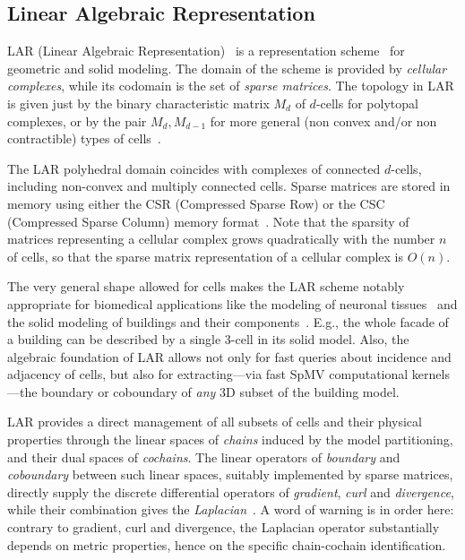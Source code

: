           


\subsection{Linear Algebraic Representation}

LAR (Linear Algebraic Representation)~\cite{Dicarlo:2014:TNL:2543138.2543294} is a 
representation scheme~\cite{Requicha:1980:RRS:356827.356833} for
geometric and solid modeling. The domain of the scheme is provided by
 \emph{cellular complexes}, while its codomain is
the set of \emph{sparse matrices}. 
The topology in LAR is given just by the
binary characteristic matrix $M_d$ of $d$-cells for polytopal complexes, or by the pair
$M_d, M_{d-1}$ for more general (non convex {and/or} non contractible) types of cells~\cite{Dicarlo:2014:TNL:2543138.2543294}. 

The LAR polyhedral domain coincides with complexes of
connected $d$-cells, including non-convex and multiply connected cells. 
Sparse matrices are 
stored in memory using either the CSR (Compressed
Sparse Row) or the CSC (Compressed Sparse Column) memory format~\cite{gemmexp}. 
Note that the sparsity of matrices representing a cellular complex grows quadratically with the number $n$ of cells, so that the sparse  matrix representation of a cellular complex is $O(n)$.

The very general shape allowed for cells makes the LAR scheme notably
appropriate for biomedical applications like the modeling of neuronal tissues~\cite{doi:10.1080/16864360.2016.1168216,ClementiSSPP-CAD16}
and the solid modeling of buildings and their components~\cite{visigrapp17:cvdlab}. E.g.,
the whole facade of a building can be described by a single 3-cell
in its solid model. Also, the algebraic foundation of LAR allows not
only for fast queries about incidence and adjacency of cells, but also
for extracting---via fast SpMV computational kernels---the boundary or coboundary 
 of \emph{any} 3D subset of the building model.

LAR provides a direct management of all subsets
of cells and their physical properties through the linear spaces of
\emph{chains} induced by the model partitioning, and their dual spaces
of \emph{cochains}. 
The linear operators of \emph{boundary} and
\emph{coboundary} between such linear spaces, suitably implemented by
sparse matrices, directly supply the discrete differential operators of \emph{gradient},
\emph{curl} and \emph{divergence}, while their combination gives the
\emph{Laplacian}~\cite{ieee-tase}. A word of warning is in order here: contrary to gradient, curl and divergence, the Laplacian operator substantially depends on metric properties, hence on the specific chain-cochain identification.


